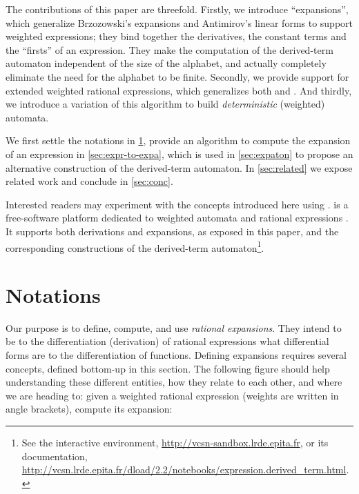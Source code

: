 \documentclass[a4paper,USenglish]{lipics}
\begin{document}
\smallskip

The contributions of this paper are threefold.  Firstly, we introduce
``expansions'', which generalize Brzozowski's expansions and Antimirov's
linear forms to support weighted expressions; they bind together the
derivatives, the constant terms and the ``firsts'' of an expression.  They
make the computation of the derived-term automaton independent of the size
of the alphabet, and actually completely eliminate the need for the alphabet
to be finite.  Secondly, we provide support for extended weighted rational
expressions, which generalizes both \citet{lombardy.2005.tcs} and
\citet{caron.2011.lata.2}. And thirdly, we introduce a variation of this
algorithm to build \emph{deterministic} (weighted) automata.

We first settle the notations in \cref{sec:notations}, provide an algorithm
to compute the expansion of an expression in \cref{sec:expr-to-expa}, which
is used in \cref{sec:expaton} to propose an alternative construction of the
derived-term automaton.  In \cref{sec:related} we expose related work and
conclude in \cref{sec:conc}.

\smallskip

Interested readers may experiment with the concepts introduced here using
\vcsn.  \vcsn is a free-software platform dedicated to weighted automata and
rational expressions \citep{demaille.13.ciaa}.  It supports both derivations
and expansions, as exposed in this paper, and the corresponding
constructions of the derived-term automaton\footnote{\label{foot:url}See the
  interactive
  environment, \url{http://vcsn-sandbox.lrde.epita.fr}, or its documentation,\\
  \url{http://vcsn.lrde.epita.fr/dload/2.2/notebooks/expression.derived_term.html}.}.



\section{Notations}
\label{sec:notations}

\newcommand{\OB}[2]{\overbrace{#2}^{\text{#1}}}
\newcommand{\POB}[2]{\OB{\makebox[0pt]{#1}}{\vphantom{\bra{2}}#2}}
\newcommand{\UB}[2]{\underbrace{#2}_{\text{#1}}}
\newcommand{\PUB}[2]{\UB{\makebox[0pt]{#1}}{\vphantom{\bra{2}}#2}}

Our purpose is to define, compute, and use \emph{rational expansions}.  They
intend to be to the differentiation (derivation) of rational expressions
what differential forms are to the differentiation of functions.  Defining
expansions requires several concepts, defined bottom-up in this section.
The following figure should help understanding these different entities, how
they relate to each other, and where we are heading to: given a weighted
rational expression  (weights are written in angle
brackets), compute its expansion:
\vspace{-.8\baselineskip}
\end{document}
